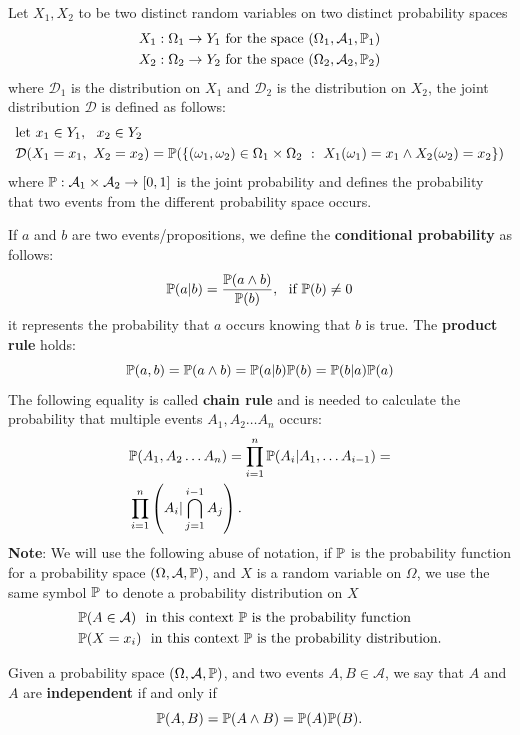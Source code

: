 \documentclass[10pt, letterpaper]{report}
\begin{document}
Let $X_1,X_2$ to be two distinct random variables on two distinct probability spaces\begin{align}
    &X_1:\Omega_1\rightarrow Y_1 \text{ for the space }(\Omega_1,\mathcal A_1,{\mathbb P}_1)\\
    &X_2:\Omega_2\rightarrow Y_2 \text{ for the space }(\Omega_2,\mathcal A_2,{\mathbb P}_2)
\end{align}
where $\mathcal D_1$ is the distribution on $X_1$ and $\mathcal D_2$ is the distribution on $X_2$, the joint distribution $\mathcal D$ is defined as follows:\begin{align}
    &\text{let }x_1\in Y_1, \ \ x_2\in Y_2\\
    &\mathcal D(X_1=x_1, \ X_2=x_2)=\Prob(\{(\omega_1,\omega_2)\in\Omega_1\times\Omega_2 \ : \ X_1(\omega_1)=x_1\land X_2(\omega_2)=x_2\})
\end{align}
where ${\mathbb P}:\mathcal A_1\times\mathcal A_2\rightarrow[0,1]$ is the joint probability and defines the probability that two events from the different probability space occurs.\bigskip

If $a$ and $b$ are two events/propositions, we define the \textbf{conditional probability} as follows:\begin{equation}
    \Prob(a|b)=\frac{\Prob(a\land b)}{\Prob(b)}, \ \ \text{if }\Prob(b)\ne0
\end{equation}
it represents the probability that $a$ occurs knowing that $b$ is true. The \textbf{product rule} holds:\begin{equation}
    {\mathbb P}(a,b)={\mathbb P}(a\land b)={\mathbb P}(a|b){\mathbb P}(b)={\mathbb P}(b|a){\mathbb P}(a)
\end{equation}
The following equality is called \textbf{chain rule} and is needed to calculate the probability that multiple events $A_1,A_2\dots A_n$ occurs:\begin{align}
    &{\mathbb P}(A_1,A_2\dots A_n)=\prod_{i=1}^n{\mathbb P}(A_i|A_1,\dots A_{i-1})=
    \\ &\prod_{i=1}^n\left( A_i|\bigcap_{j=1}^{i-1} A_j \right).
\end{align}
\textbf{Note}: We will use the following abuse of notation, if ${\mathbb P}$ is the probability function for a probability space $(\Omega,\mathcal A,{\mathbb P})$, and $X$ is a random variable on $\Omega$, we use the same symbol ${\mathbb P}$ to denote a probability distribution on $X$\begin{align}
    &{\mathbb P}(A\in\mathcal A) \ \ \text{in this context ${\mathbb P}$ is the probability function}\\
    &{\mathbb P}(X=x_i) \ \ \text{in this context ${\mathbb P}$ is the probability distribution.}
\end{align}
\begin{definition}
    Given a probability space $(\Omega,\mathcal A,{\mathbb P})$, and two events $A,B\in\mathcal A$, we say that $A$ and $A$ are \textbf{independent} if and only if\begin{equation}
        {\mathbb P}(A, B)={\mathbb P}(A\land B)={\mathbb P}(A){\mathbb P}(B).
    \end{equation}
\end{definition}
\end{document}
